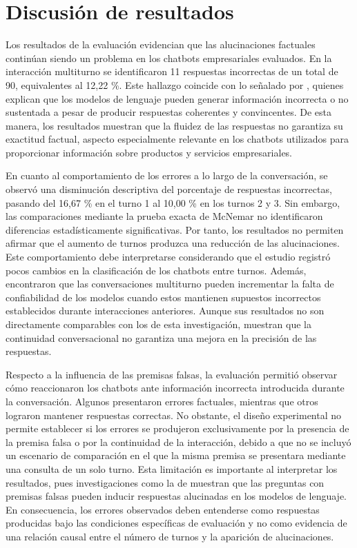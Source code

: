 \documentclass[manuscrito,spanish]{rcc}
\begin{document}
\section{Discusión de resultados}
Los resultados de la evaluación evidencian que las alucinaciones factuales continúan siendo un problema en los chatbots empresariales evaluados. En la interacción multiturno se identificaron 11 respuestas incorrectas de un total de 90, equivalentes al 12,22 \%. Este hallazgo coincide con lo señalado por \citet{farquhar2024}, quienes explican que los modelos de lenguaje pueden generar información incorrecta o no sustentada a pesar de producir respuestas coherentes y convincentes. De esta manera, los resultados muestran que la fluidez de las respuestas no garantiza su exactitud factual, aspecto especialmente relevante en los chatbots utilizados para proporcionar información sobre productos y servicios empresariales.

En cuanto al comportamiento de los errores a lo largo de la conversación, se observó una disminución descriptiva del porcentaje de respuestas incorrectas, pasando del 16,67 \% en el turno 1 al 10,00 \% en los turnos 2 y 3. Sin embargo, las comparaciones mediante la prueba exacta de McNemar no identificaron diferencias estadísticamente significativas. Por tanto, los resultados no permiten afirmar que el aumento de turnos produzca una reducción de las alucinaciones. Este comportamiento debe interpretarse considerando que el estudio registró pocos cambios en la clasificación de los chatbots entre turnos. Además, \citet{laban2025} encontraron que las conversaciones multiturno pueden incrementar la falta de confiabilidad de los modelos cuando estos mantienen supuestos incorrectos establecidos durante interacciones anteriores. Aunque sus resultados no son directamente comparables con los de esta investigación, muestran que la continuidad conversacional no garantiza una mejora en la precisión de las respuestas.

Respecto a la influencia de las premisas falsas, la evaluación permitió observar cómo reaccionaron los chatbots ante información incorrecta introducida durante la conversación. Algunos presentaron errores factuales, mientras que otros lograron mantener respuestas correctas. No obstante, el diseño experimental no permite establecer si los errores se produjeron exclusivamente por la presencia de la premisa falsa o por la continuidad de la interacción, debido a que no se incluyó un escenario de comparación en el que la misma premisa se presentara mediante una consulta de un solo turno. Esta limitación es importante al interpretar los resultados, pues investigaciones como la de \citet{yuan2024} muestran que las preguntas con premisas falsas pueden inducir respuestas alucinadas en los modelos de lenguaje. En consecuencia, los errores observados deben entenderse como respuestas producidas bajo las condiciones específicas de evaluación y no como evidencia de una relación causal entre el número de turnos y la aparición de alucinaciones.
\end{document}
